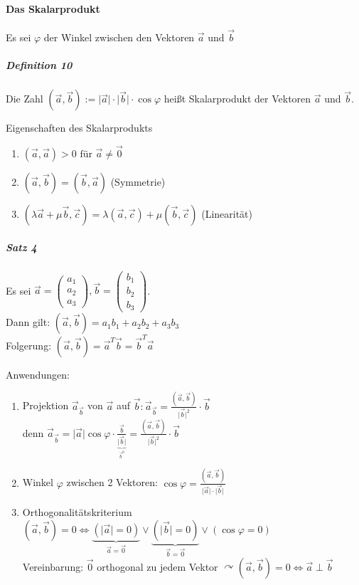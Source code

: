 \documentclass[a4paper]{scrartcl}
\begin{document}
\paragraph{Das Skalarprodukt}
Es sei $\varphi$ der Winkel zwischen den Vektoren $\vec{a} \text{ und } \vec{b}$\\
\subparagraph{Definition 10} Die Zahl $(\vec{a},\vec{b}) := \lvert\vec{a}\rvert \cdot \lvert \vec{b} \rvert \cdot \cos{\varphi}$ heißt Skalarprodukt der Vektoren $\vec{a}$ und $\vec{b}$.

Eigenschaften des Skalarprodukts
\begin{enumerate}
\item $(\vec{a},\vec{a}) > 0 \text{ für } \vec{a} \neq \vec{0}$
\item $(\vec{a},\vec{b}) = (\vec{b},\vec{a})$ (Symmetrie)
\item $(\lambda \vec{a} + \mu \vec{b}, \vec{c})= \lambda (\vec{a},\vec{c}) + \mu (\vec{b},\vec{c})$ (Linearität)
\end{enumerate}

\subparagraph{Satz 4} Es sei $\vec{a} = \begin{pmatrix} a_1 \\ a_2 \\ a_3 \end{pmatrix}, \vec{b} = \begin{pmatrix} b_1 \\ b_2 \\ b_3 \end{pmatrix}$.\\
Dann gilt: $(\vec{a},\vec{b}) = a_1 b_1 + a_2b_2 + a_3b_3$\\
Folgerung: $(\vec{a},\vec{b}) = \vec{a}^T \vec{b} = \vec{b}^T \vec{a}$

Anwendungen:
\begin{enumerate}
\item Projektion $\vec{a}_{\vec{b}}$ von $\vec{a}$ auf $\vec{b}: \vec{a}_{\vec{b}} = \frac{(\vec{a},\vec{b})}{\lvert \vec{b} \rvert^2} \cdot \vec{b}$\\
denn %
$\vec{a}_{\vec{b}} = \lvert \vec{a} \rvert \cos{\varphi} \cdot \frac{\vec{b}}{\underbrace{\lvert \vec{b} \rvert}_{\vec{b}^0}} = \frac{(\vec{a},\vec{b})}{\lvert \vec{b} \rvert^2} \cdot \vec{b}$
\item Winkel $\varphi$ zwischen 2 Vektoren: $\cos{\varphi} = \frac{(\vec{a},\vec{b})}{\lvert \vec{a} \rvert \cdot \lvert \vec{b} \rvert}$
\item Orthogonalitätskriterium
$(\vec{a},\vec{b}) = 0 \Leftrightarrow \underbrace{(\lvert \vec{a} \rvert = 0 )}_{\vec{a} = \vec{0}} \vee \underbrace{(\lvert \vec{b} \rvert = 0 )}_{\vec{b} = \vec{0}} \vee (\cos{\varphi} = 0)$\\
Vereinbarung: $\vec{0}$ orthogonal zu jedem Vektor $\curvearrowright (\vec{a},\vec{b})=0 \Leftrightarrow \vec{a} \perp \vec{b}$
\end{enumerate}
\end{document}
